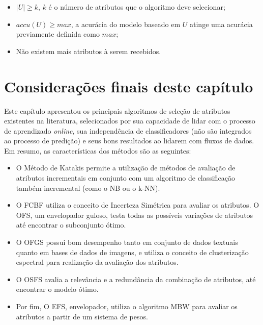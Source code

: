  \begin{itemize}
 \item $|U| \geq k$, $k$ é o número de atributos que o algoritmo deve selecionar;
 \item $accu(U) \geq max$, a acurácia do modelo baseado em $U$ atinge uma acurácia previamente definida como $max$;
 \item Não existem mais atributos à serem recebidos.
 \end{itemize}

\section{Considerações finais deste capítulo}

Este capítulo apresentou os principais algoritmos de seleção de atributos existentes na literatura, selecionados por sua capacidade de lidar com o processo de aprendizado \textit{online}, sua independência de classificadores (não são integrados ao processo de predição) e seus bons resultados ao lidarem com fluxos de dados. 
Em resumo, as características dos métodos são as seguintes:

\begin{itemize}
\item O Método de Katakis permite a utilização de métodos de avaliação de atributos incrementais em conjunto com um algoritmo de classificação também incremental (como o NB ou o k-NN). 

\item O FCBF utiliza o conceito de Incerteza Simétrica para avaliar os atributos. O OFS, um envelopador guloso, testa todas as possíveis variações de atributos até encontrar o subconjunto ótimo. 
\item O OFGS possui bom desempenho tanto em conjunto de dados textuais quanto em bases de dados de imagens, e utiliza o conceito de clusterização espectral para realização da avaliação dos atributos. 
\item O OSFS avalia a relevância e a redundância da combinação de atributos, até encontrar o modelo ótimo. 
\item Por fim, O EFS, envelopador, utiliza o algoritmo MBW para avaliar os atributos a partir de um sistema de pesos.
\end{itemize}






